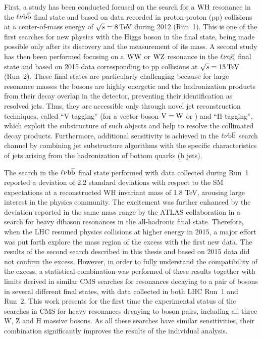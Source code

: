 First, a study has been conducted focused on the search for a $\mathrm{W}\mathrm{H}$ resonance in the $\ell\nu{\mathrm{b}\overline{\mathrm{b}}}$ final state and based on data recorded in proton-proton (pp) collisions at a center-of-mass energy of $\sqrt{s} = 8\,\text{Te\hspace{-.08em}V}$ during 2012 (Run~1). This is one of the first searches for new physics with the Higgs boson in the final state, being made possible only after its discovery and the measurement of its mass.
A second study has then been performed focusing on a $\mathrm{W}\mathrm{W}$ or $\mathrm{W}\mathrm{Z}$ resonance in the $\ell\nu\mathrm{q}\overline{\mathrm{q}}$ final state and based on 2015 data corresponding to pp collisions at $\sqrt{s} = 13\,\text{Te\hspace{-.08em}V}$ (Run~2).
These final states are particularly challenging because for large resonance masses the bosons are highly energetic and the hadronization products from their decay overlap in the detector, preventing their identification as resolved jets.
Thus, they are accessible only through novel jet reconstruction techniques, called ``V tagging'' (for a vector boson $\mathrm{V} = \mathrm{W}$ or \PZ) and ``H tagging'', which exploit the substructure of such objects and help to resolve the collimated decay products.
Furthermore, additional sensitivity is achieved in the $\ell\nu{\mathrm{b}\overline{\mathrm{b}}}$ search channel by combining jet substructure algorithms with the specific characteristics of jets arising from the hadronization of bottom quarks (b jets).

The search in the $\ell\nu{\mathrm{b}\overline{\mathrm{b}}}$ final state performed with data collected during Run~1 reported a deviation of 2.2 standard deviations with respect to the SM expectations at a reconstructed WH invariant mass of 1.8 TeV, arousing large interest in the physics community. The excitement was further enhanced by the deviation reported in the same mass range by the ATLAS collaboration in a search for heavy diboson resonances in the all-hadronic final state. 
Therefore, when the LHC resumed physics collisions at higher energy in 2015, a major effort was put forth explore the mass region of the excess with the first new data. The results of the second search described in this thesis and based on 2015 data did not confirm the excess. However, in order to fully understand the compatibility of the excess, a statistical combination was performed of these results together with limits derived in similar CMS searches for resonances decaying to a pair of bosons in several different final states, with data collected in both LHC Run~1 and Run~2.
This work presents for the first time the experimental status of the searches in CMS for heavy resonances decaying to boson pairs, including all three W, Z and H massive bosons.
As all these searches have similar sensitivities, their combination significantly improves the results of the individual analysis.

